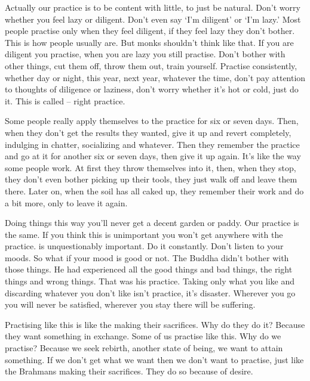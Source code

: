 Actually our practice is to be content with little, to just be natural. Don't worry whether you feel lazy or diligent. Don't even say `I'm diligent' or `I'm lazy.' Most people practise only when they feel diligent, if they feel lazy they don't bother. This is how people usually are. But monks shouldn't think like that. If you are diligent you practise, when you are lazy you still practise. Don't bother with other things, cut them off, throw them out, train yourself. Practise consistently, whether day or night, this year, next year, whatever the time, don't pay attention to thoughts of diligence or laziness, don't worry whether it's hot or cold, just do it. This is called  -- right practice. 

Some people really apply themselves to the practice for six or seven days. Then, when they don't get the results they wanted, give it up and revert completely, indulging in chatter, socializing and whatever. Then they remember the practice and go at it for another six or seven days, then give it up again. It's like the way some people work. At first they throw themselves into it, then, when they stop, they don't even bother picking up their tools, they just walk off and leave them there. Later on, when the soil has all caked up, they remember their work and do a bit more, only to leave it again. 

Doing things this way you'll never get a decent garden or paddy. Our practice is the same. If you think this  is unimportant you won't get anywhere with the practice.  is unquestionably important. Do it constantly. Don't listen to your moods. So what if your mood is good or not. The Buddha didn't bother with those things. He had experienced all the good things and bad things, the right things and wrong things. That was his practice. Taking only what you like and discarding whatever you don't like isn't practice, it's disaster. Wherever you go you will never be satisfied, wherever you stay there will be suffering. 

Practising like this is like the  making their sacrifices. Why do they do it? Because they want something in exchange. Some of us practise like this. Why do we practise? Because we seek rebirth, another state of being, we want to attain something. If we don't get what we want then we don't want to practise, just like the Brahmans making their sacrifices. They do so because of desire. 

